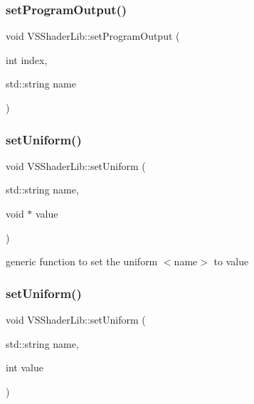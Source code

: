 \mbox{\label{class_v_s_shader_lib_a6e2ba341bb680d14e39b632bace85bd3}} 
\subsubsection{\texorpdfstring{set\+Program\+Output()}{setProgramOutput()}}
{\footnotesize\ttfamily void V\+S\+Shader\+Lib\+::set\+Program\+Output (\begin{DoxyParamCaption}\item[{int}]{index,  }\item[{std\+::string}]{name }\end{DoxyParamCaption})}

\mbox{\label{class_v_s_shader_lib_a8126bd520baadedd4d892a30c4efa9da}} 
\subsubsection{\texorpdfstring{set\+Uniform()}{setUniform()}\hspace{0.1cm}{\footnotesize\ttfamily [1/3]}}
{\footnotesize\ttfamily void V\+S\+Shader\+Lib\+::set\+Uniform (\begin{DoxyParamCaption}\item[{std\+::string}]{name,  }\item[{void $\ast$}]{value }\end{DoxyParamCaption})}



generic function to set the uniform $<$name$>$ to value 

\mbox{\label{class_v_s_shader_lib_a6d0aa9cc7add41f1d6f30d29efbea0ec}} 
\subsubsection{\texorpdfstring{set\+Uniform()}{setUniform()}\hspace{0.1cm}{\footnotesize\ttfamily [2/3]}}
{\footnotesize\ttfamily void V\+S\+Shader\+Lib\+::set\+Uniform (\begin{DoxyParamCaption}\item[{std\+::string}]{name,  }\item[{int}]{value }\end{DoxyParamCaption})}



